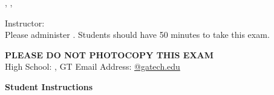 \vspace*{-1cm}

\begin{center}
{\Large \TestName, \Course, \Semester \ \Year}
\end{center}

\begin{center}    
{\small
Instructor: \Instructors \\ Please administer \TestDate. Students should have 50 minutes to take this exam. 
}
\end{center}

\begin{center} 
    \textbf{PLEASE DO NOT PHOTOCOPY THIS EXAM} \\[8pt]
    {\small 
    High School:  \underline{\hspace{4cm}}, GT Email Address: \underline{\hspace{4cm} @gatech.edu} 
    }
\end{center}



\vspace{9cm}

\vspace{12pt}
\textbf{Student Instructions}
{\small \InstructionsDistanceStudents}

